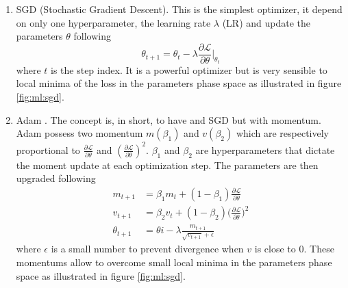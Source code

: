 \documentclass[../main.tex]{subfiles}
\begin{document}
\begin{enumerate}
  \item SGD (Stochastic Gradient Descent). This is the simplest optimizer, it depend on only one hyperparameter, the learning rate $\lambda$ (LR) and update the parameters $\theta$ following \begin{equation}
      \theta_{t+1} = \theta_t - \lambda \frac{\partial \mathcal{L}}{\partial \theta}\bigg|_{\theta_t}
    \end{equation}
    where $t$ is the step index. It is a powerful optimizer but is very sensible to local minima of the loss in the parameters phase space as illustrated in figure \ref{fig:ml:sgd}.

  \item Adam \cite{kingma_adam_2017}. The concept is, in short, to have and SGD but with momentum. Adam possess two momentum $m(\beta_1)$ and $v(\beta_2)$ which are respectively proportional to $\frac{\partial \mathcal{L}}{\partial \theta}$ and $(\frac{\partial \mathcal{L}}{\partial \theta})^2$. $\beta_1$ and $\beta_2$ are hyperparameters that dictate the moment update at each optimization step. The parameters are then upgraded following \begin{align}
      m_{t+1} &= \beta_1 m_t + (1 - \beta_1) \frac{\partial \mathcal{L}}{\partial \theta} \\
      v_{t+1} &= \beta_2 v_t + (1 - \beta_2) \bigg(\frac{\partial \mathcal{L}}{\partial \theta}\bigg)^2 \\
      \theta_{t+1} &= \theta{i} - \lambda \frac{m_{t+1}}{\sqrt{v_{t+1}} + \epsilon}
    \end{align}
    where $\epsilon$ is a small number to prevent divergence when $v$ is close to 0. These momentums allow to overcome small local minima in the parameters phase space as illustrated in figure \ref{fig:ml:sgd}.
\end{enumerate}
\end{document}
